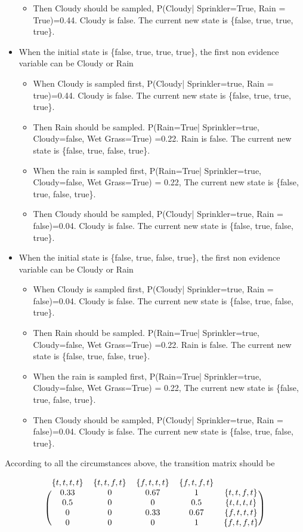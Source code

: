 \documentclass{article}
\begin{document}
\begin{itemize}
\begin{itemize}
\item Then Cloudy should be sampled,  P(Cloudy| Sprinkler=True, Rain = True)=0.44. Cloudy is false. The current new state is  \{false, true, true, true\}.
\end{itemize}
\item When the initial state is \{false, true, true, true\}, the first non evidence variable can be Cloudy or Rain
\begin{itemize}
\item When Cloudy is sampled first, P(Cloudy| Sprinkler=true, Rain = true)=0.44. Cloudy is false. The current new state is  \{false, true, true, true\}.  
\item Then Rain should be sampled. P(Rain=True| Sprinkler=true, Cloudy=false, Wet Grass=True) =0.22. Rain is false. The current new state is  \{false, true, false, true\}.
\item When the rain is sampled first, P(Rain=True| Sprinkler=true, Cloudy=false, Wet Grass=True) = 0.22, The current new state is  \{false, true, false, true\}. 
\item Then Cloudy should be sampled,  P(Cloudy| Sprinkler=true, Rain = false)=0.04. Cloudy is false. The current new state is  \{false, true, false, true\}.
\end{itemize}
\item When the initial state is \{false, true, false, true\}, the first non evidence variable can be Cloudy or Rain
\begin{itemize}
\item When Cloudy is sampled first, P(Cloudy| Sprinkler=true, Rain = false)=0.04. Cloudy is false. The current new state is  \{false, true, false, true\}.  
\item Then Rain should be sampled. P(Rain=True| Sprinkler=true, Cloudy=false, Wet Grass=True) =0.22. Rain is false. The current new state is  \{false, true, false, true\}.
\item When the rain is sampled first, P(Rain=True| Sprinkler=true, Cloudy=false, Wet Grass=True) = 0.22, The current new state is  \{false, true, false, true\}. 
\item Then Cloudy should be sampled,  P(Cloudy| Sprinkler=true, Rain = false)=0.04. Cloudy is false. The current new state is  \{false, true, false, true\}.
\end{itemize}
\end{itemize}
According to all the circumstances above, the transition matrix should be 

\[
\begin{blockarray}{cccccc}
\{t, t, t, t\} & \{t, t, f, t\} & \{f, t, t, t\} & \{f, t, f, t\} \\
\begin{block}{(ccccc)c}
  0.33 & 0 & 0.67 & 1 & \{t, t, f, t\} \\
  0.5 & 0 & 0 & 0.5 &  \{t, t, t, t\} \\
  0 & 0 & 0.33 & 0.67 & \{f, t, t, t\} \\
  0 & 0 & 0 & 1 & \{f, t, f, t\} \\
\end{block}
\end{blockarray}
 \]
\end{document}
